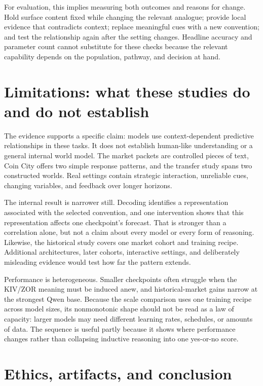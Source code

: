 For evaluation, this implies measuring both outcomes and reasons for change. Hold
surface content fixed while changing the relevant analogue;
provide local evidence that contradicts context; replace meaningful cues with a
new convention; and test the relationship again after the setting changes.
Headline accuracy and parameter count cannot substitute for these checks because
the relevant capability depends on the population, pathway, and decision at hand.

\section{Limitations: what these studies do and do not establish}
\label{sec:limitations}

The evidence supports a specific claim: models use context-dependent predictive
relationships in these tasks. It does not establish human-like understanding or
a general internal world model. The market packets are controlled pieces of
text, Coin City offers two simple response patterns, and the transfer study spans
two constructed worlds. Real settings contain strategic interaction,
unreliable cues, changing variables, and feedback over longer horizons.

The internal result is narrower still. Decoding identifies a representation
associated with the selected convention, and one intervention shows that this
representation affects one checkpoint's forecast. That is stronger than a
correlation alone, but not a claim about every model or every form of reasoning.
Likewise, the historical study covers one market cohort and training recipe.
Additional architectures, later cohorts, interactive settings, and deliberately
misleading evidence would test how far the pattern extends.

Performance is heterogeneous. Smaller checkpoints often struggle when the
KIV/ZOR meaning must be induced anew, and historical-market gains narrow at the
strongest Qwen base. Because the scale comparison uses one training recipe across
model sizes, its nonmonotonic shape should not be read as a law of capacity:
larger models may need different learning rates, schedules, or amounts of data.
The sequence is useful partly because it shows where performance changes rather
than collapsing inductive reasoning into one yes-or-no score.

\section{Ethics, artifacts, and conclusion}
\label{sec:conclusion}

